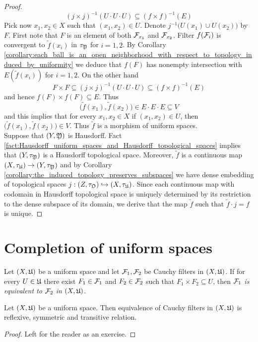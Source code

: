 \begin{proof}
$$\left(j\times j\right)^{-1}\left(U\cdot U \cdot U\right) \subseteq \left(f\times f\right)^{-1}(E)$$
Pick now $x_1,x_2 \in X$ such that $(x_1,x_2) \in U$. Denote $j^{-1}\big(U(x_1)\cup U(x_2)\big)$ by $F$. First note that $F$ is an element of both ${\mathcal F}_{x_1}$ and ${\mathcal F}_{x_2}$. Filter $f({\mathcal F}_i)$ is convergent to $\tilde{f}(x_i)$ in $\tau_{{\mathfrak Y}}$ for $i=1,2$. By Corollary \ref{corollary:each_ball_is_an_open_neighborhood_with_respect_to_topology_induced_by_uniformity} we deduce that $f(F)$ has nonempty intersection with $E(\tilde{f}(x_i))$ for $i=1,2$. On the other hand
$$F\times F \subseteq \left(j\times j\right)^{-1}\left(U\cdot U \cdot U\right)\subseteq \left(f\times f\right)^{-1}(E)$$
and hence $f(F)\times f(F) \subseteq E$. Thus
$$\big(\tilde{f}(x_1),\tilde{f}(x_2)\big) \in E\cdot E\cdot E\subseteq V$$
and this implies that for every $x_1,x_2\in X$ if $(x_1,x_2) \in U$, then $\big(\tilde{f}(x_1),\tilde{f}(x_2)\big) \in V$. Thus $\tilde{f}$ is a morphism of uniform spaces.\\
Suppose that $(Y,{\mathfrak Y})$ is Hausdorff. Fact \ref{fact:Hausdorff_uniform_spaces_and_Hausdorff_topological_spaces} implies that $(Y,\tau_{{\mathfrak Y}})$ is a Hausdorff topological space. Moreover, $\tilde{f}$ is a continuous map $\left(X,\tau_{{\mathfrak U}}\right) \rightarrow \left(Y,\tau_{{\mathfrak Y}}\right)$ and by Corollary \ref{corollary:the_induced_topology_preserves_subspaces} we have dense embedding of topological spaces $j:\left(Z,\tau_{{\mathfrak O}}\right)\hookrightarrow \left(X,\tau_{{\mathfrak U}}\right)$. Since each continuous map with codomain in Hausdorff topological space is uniquely determined by its restriction to the dense subspace of its domain, we derive that the map $\tilde{f}$ such that $\tilde{f} \cdot j = f$ is unique.
\end{proof}

\section{Completion of uniform spaces}

\begin{definition}
Let $(X,{\mathfrak U})$ be a uniform space and let ${\mathcal F}_1,{\mathcal F}_2$ be Cauchy filters in $(X,{\mathfrak U})$. If for every $U\in {\mathfrak U}$ there exist $F_1 \in {\mathcal F}_1$ and $F_2 \in {\mathcal F}_2$ such that $F_1\times F_2 \subseteq U$, then \textit{${\mathcal F}_1$ is equivalent to ${\mathcal F}_2$ in $(X,{\mathfrak U})$}.
\end{definition}

\begin{fact}\label{fact:equivalence_of_Cauchy_filters_is_equivalence_relation}
Let $(X,{\mathfrak U})$ be a uniform space. Then equivalence of Cauchy filters in $(X,{\mathfrak U})$ is reflexive, symmetric and transitive relation.
\end{fact}
\begin{proof}
Left for the reader as an exercise.
\end{proof}

